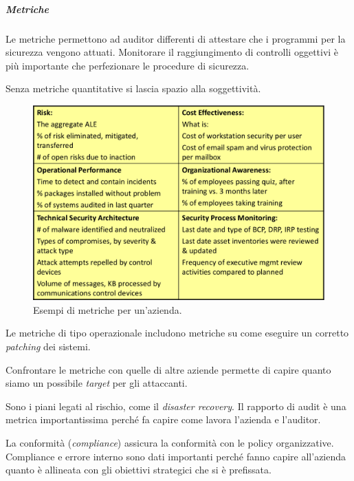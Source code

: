 \subparagraph{Metriche}

Le metriche permettono ad auditor differenti di attestare che i programmi per
la sicurezza vengono attuati. Monitorare il raggiungimento di controlli oggettivi
è più importante che perfezionare le procedure di sicurezza.

Senza metriche quantitative si lascia spazio alla soggettività.

\begin{figure}[h!]
        \begin{center}
                \includegraphics[scale=1.5]{res/img/metriche}
        \end{center}
        \caption{Esempi di metriche per un'azienda.}
\end{figure}


Le metriche di tipo operazionale includono metriche su come eseguire
un corretto \textit{patching} dei sistemi.

Confrontare le metriche con quelle di altre aziende permette di capire quanto
siamo un possibile \textit{target} per gli attaccanti.


Sono i piani legati al rischio, come il \textit{disaster recovery}.
Il rapporto di audit è una metrica importantissima perché fa capire come lavora
l'azienda e l'auditor.


La conformità (\textit{compliance}) assicura la conformità con le policy
organizzative. Compliance e errore interno sono dati importanti perché
fanno capire all'azienda quanto è allineata con gli obiettivi strategici che si
è prefissata.


